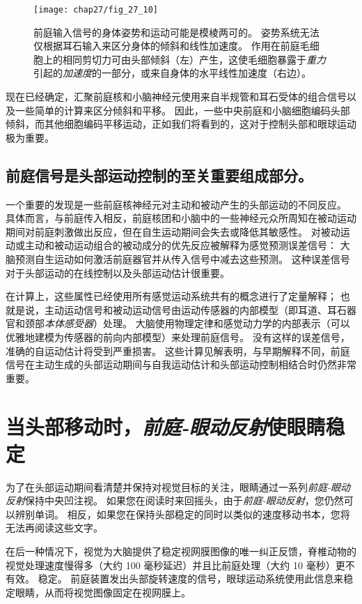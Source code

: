 \begin{figure}[htbp]
	\centering
	\texttt{[image: chap27/fig\_27\_10]}
	\caption{前庭输入信号的身体姿势和运动可能是模棱两可的。
		姿势系统无法仅根据耳石输入来区分身体的倾斜和线性加速度。
		作用在前庭毛细胞上的相同剪切力可由头部倾斜（左）产生，这使毛细胞暴露于\textit{重力}引起的\textit{加速度}的一部分，或来自身体的水平线性加速度（右边）。}
	\label{fig:27_10}
\end{figure}


现在已经确定，汇聚前庭核和小脑神经元使用来自半规管和耳石受体的组合信号以及一些简单的计算来区分倾斜和平移。
因此，一些中央前庭和小脑细胞编码头部倾斜，而其他细胞编码平移运动，正如我们将看到的，这对于控制头部和眼球运动极为重要。



\subsection{前庭信号是头部运动控制的至关重要组成部分。}

一个重要的发现是一些前庭核神经元对主动和被动产生的头部运动的不同反应。
具体而言，与前庭传入相反，前庭核团和小脑中的一些神经元众所周知在被动运动期间对前庭刺激做出反应，但在自生运动期间会失去或降低其敏感性。
对被动运动或主动和被动运动组合的被动成分的优先反应被解释为感觉预测误差信号：
大脑预测自生运动如何激活前庭器官并从传入信号中减去这些预测。
这种误差信号对于头部运动的在线控制以及头部运动估计很重要。


在计算上，这些属性已经使用所有感觉运动系统共有的概念进行了定量解释；
也就是说，主动运动信号和被动运动信号由运动传感器的内部模型（即耳道、耳石器官和颈部\textit{本体感受器}）处理。
大脑使用物理定律和感觉动力学的内部表示（可以优雅地建模为传感器的前向内部模型）来处理前庭信号。
没有这样的误差信号，准确的自运动估计将受到严重损害。
这些计算见解表明，与早期解释不同，前庭信号在主动生成的头部运动期间与自我运动估计和头部运动控制相结合时仍然非常重要。



\section{当头部移动时，\textit{前庭-眼动反射}使眼睛稳定}

为了在头部运动期间看清楚并保持对视觉目标的关注，眼睛通过一系列\textit{前庭-眼动反射}保持中央凹注视。
如果您在阅读时来回摇头，由于\textit{前庭-眼动反射}，您仍然可以辨别单词。
相反，如果您在保持头部稳定的同时以类似的速度移动书本，您将无法再阅读这些文字。


在后一种情况下，视觉为大脑提供了稳定视网膜图像的唯一纠正反馈，脊椎动物的视觉处理速度慢得多（大约 100 毫秒延迟）并且比前庭处理（大约 10 毫秒）更不有效。 稳定。
前庭装置发出头部旋转速度的信号，眼球运动系统使用此信息来稳定眼睛，从而将视觉图像固定在视网膜上。


